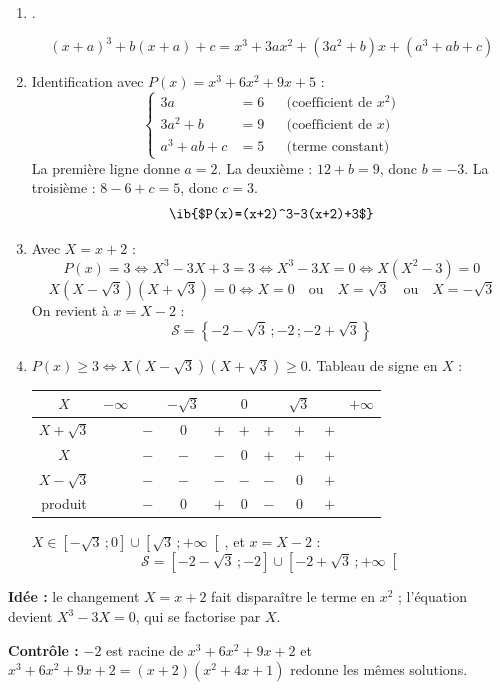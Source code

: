 \begin{enumerate}[itemsep=14pt]
  \item
  \begin{prop}
  .
  \end{prop}
  \[(x+a)^3+b(x+a)+c=x^3+3ax^2+(3a^2+b)x+(a^3+ab+c)\]

  \item Identification avec $P(x)=x^3+6x^2+9x+5$ :
  \[
  \left\{
  \begin{aligned}
    3a&=6 &&\text{(coefficient de }x^2\text{)}\\
    3a^2+b&=9 &&\text{(coefficient de }x\text{)}\\
    a^3+ab+c&=5 &&\text{(terme constant)}
  \end{aligned}
  \right.
  \]
  La première ligne donne $a=2$. La deuxième : $12+b=9$, donc $b=-3$. La troisième : $8-6+c=5$, donc $c=3$.
  \[\ib{$P(x)=(x+2)^3-3(x+2)+3$}\]

  \item Avec $X=x+2$ :
  \[P(x)=3\iff X^3-3X+3=3\iff X^3-3X=0\iff X\left(X^2-3\right)=0\]
  \[X\left(X-\sqrt3\right)\left(X+\sqrt3\right)=0\iff X=0\quad\text{ou}\quad X=\sqrt3\quad\text{ou}\quad X=-\sqrt3\]
  On revient à $x=X-2$ :
  \[\mathcal S=\left\{-2-\sqrt3\,;-2\,;-2+\sqrt3\right\}\]

  \item $P(x)\geq3\iff X\left(X-\sqrt3\right)\left(X+\sqrt3\right)\geq0$. Tableau de signe en $X$ :
  \begin{center}
  
  \begin{tabular}{c|ccccccccc}
    $X$ & $-\infty$ & & $-\sqrt3$ & & $0$ & & $\sqrt3$ & & $+\infty$ \\ \hline
    $X+\sqrt3$ & & $-$ & $0$ & $+$ & $+$ & $+$ & $+$ & $+$ & \\
    $X$ & & $-$ & $-$ & $-$ & $0$ & $+$ & $+$ & $+$ & \\
    $X-\sqrt3$ & & $-$ & $-$ & $-$ & $-$ & $-$ & $0$ & $+$ & \\ \hline
    produit & & $-$ & $0$ & $+$ & $0$ & $-$ & $0$ & $+$ &
  \end{tabular}
  \end{center}
  $X\in\left[-\sqrt3\,;0\right]\cup\left[\sqrt3\,;+\infty\right[$, et $x=X-2$ :
  \[\mathcal S=\left[-2-\sqrt3\,;-2\right]\cup\left[-2+\sqrt3\,;+\infty\right[\]
\end{enumerate}
\textbf{Idée :} le changement $X=x+2$ fait disparaître le terme en $x^2$ ; l'équation devient $X^3-3X=0$, qui se factorise par $X$.

\textbf{Contrôle :} $-2$ est racine de $x^3+6x^2+9x+2$ et $x^3+6x^2+9x+2=(x+2)(x^2+4x+1)$ redonne les mêmes solutions.
